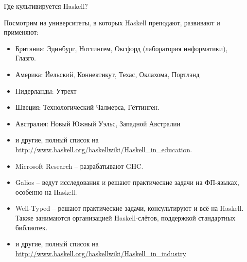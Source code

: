 \newpage
{}

Где культивируется Haskell? 


Посмотрим на университеты, в которых 
Haskell преподают, развивают и применяют:

\begin{itemize}
\item Британия: Эдинбург, Ноттингем, Оксфорд (лаборатория информатики),
    Глазго.

\item Америка: Йельский, Коннектикут, Техас, Оклахома, Портлэнд

\item Нидерланды: Утрехт

\item Швеция: Технологический Чалмерса, Гёттинген. 

\item Австралия: Новый Южный Уэльс, Западной Австралии

\item и другие, полный список на 
\url{http://www.haskell.org/haskellwiki/Haskell_in_education}. 

\end{itemize}


\begin{itemize}
\item Microsoft Research -- разрабатывают GHC.

\item Galios -- ведут исследования и решают практические
задачи на ФП-языках, особенно на Haskell.

\item Well-Typed -- решают практические задачи, консультируют
    и всё на Haskell. Также занимаются организацией Haskell-слётов,
    поддержкой стандартных библиотек. 

\item и другие, полный список на 
\url{http://www.haskell.org/haskellwiki/Haskell_in_industry}

\end{itemize}




